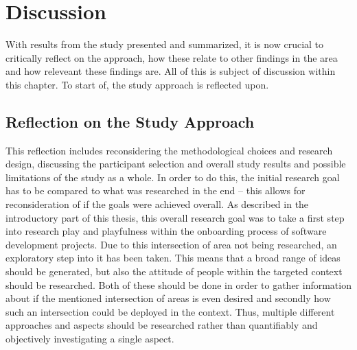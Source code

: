 \section{Discussion}

With results from the study presented and summarized, it is now crucial to critically reflect on the approach, how these relate to other findings in the area and how releveant these findings are. All of this is subject of discussion within this chapter. To start of, the study approach is reflected upon.


\subsection{Reflection on the Study Approach}

This reflection includes reconsidering the methodological choices and research design, discussing the participant selection and overall study results and possible limitations of the study as a whole. In order to do this, the initial research goal has to be compared to what was researched in the end -- this allows for reconsideration of if the goals were achieved overall. As described in the introductory part of this thesis, this overall research goal was to take a first step into research play and playfulness within the onboarding process of software development projects. Due to this intersection of area not being researched, an exploratory step into it has been taken. This means that a broad range of ideas should be generated, but also the attitude of people within the targeted context should be researched. Both of these should be done in order to gather information about if the mentioned intersection of areas is even desired and secondly how such an intersection could be deployed in the context. Thus, multiple different approaches and aspects should be researched rather than quantifiably and objectively investigating a single aspect.

